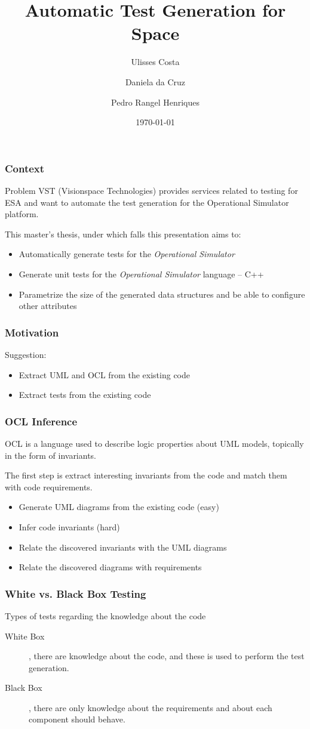 \documentclass{beamer}
\title{Automatic Test Generation for Space}
\author{Ulisses Costa \and Daniela da Cruz \and Pedro Rangel Henriques}
\institute{SLATE'12 - Symposium on Languages, Applications and Technologies}
\date{\today}
\begin{document}
\begin{frame}
   \titlepage
\end{frame}

\begin{frame}\frametitle{Context}
\begin{block}{Problem}
VST (Visionspace Technologies) provides services related to testing for ESA and want to automate
the test generation for the Operational Simulator platform.
\end{block}

This master's thesis, under which falls this presentation aims to:
\begin{itemize}
\item Automatically generate tests for the \textit{Operational Simulator}
\item Generate unit tests for the \textit{Operational Simulator} language -- C++
\item Parametrize the size of the generated data structures and be able to configure other attributes
\end{itemize}
\end{frame}

\begin{frame}\frametitle{Motivation}
Suggestion:
\begin{itemize}
\item Extract UML and OCL from the existing code
\item Extract tests from the existing code
\end{itemize}
\end{frame}

\begin{frame}\frametitle{OCL Inference}
OCL is a language used to describe logic properties about UML models, topically in the form of invariants.

The first step is extract interesting invariants from the code and match them with code requirements.
\begin{itemize}
\item Generate UML diagrams from the existing code (easy)
\item Infer code invariants (hard)
\item Relate the discovered invariants with the UML diagrams
\item Relate the discovered diagrams with requirements
\end{itemize}
\end{frame}

\begin{frame}\frametitle{White vs. Black Box Testing}
\begin{block}{Types of tests regarding the knowledge about the code}
\begin{description}
\item[White Box], there are knowledge about the code, and these is used to perform the test generation.
\item[Black Box], there are only knowledge about the requirements and about each component should behave.
\end{description}
\end{block}
\end{frame}
\end{document}
